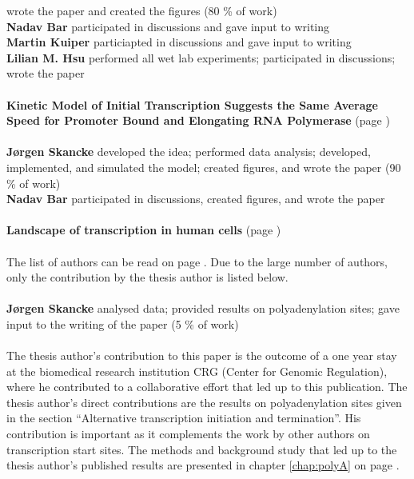 wrote the paper and created the figures (80 \% of work) \\
\textbf{Nadav Bar} participated in discussions and gave input to writing\\
\textbf{Martin Kuiper} particiapted in discussions and gave input to writing\\
\textbf{Lilian M. Hsu} performed all wet lab experiments;
participated in discussions; wrote the paper\\
\\
\textbf{Kinetic Model of Initial Transcription Suggests the Same Average Speed
for Promoter Bound and Elongating RNA Polymerase} (page \pageref{chap:kinetic_paper})\\
\\
\textbf{J\o rgen Skancke} developed the idea;
performed data analysis; developed, implemented, and simulated the model;
created figures, and wrote the paper (90 \% of work) \\
\textbf{Nadav Bar} participated in discussions, created figures, and wrote the
paper\\
\\
\textbf{Landscape of transcription in human cells} (page \pageref{landscape_attached})\\
\\
The list of authors can be read on page \pageref{landscape_attached}. Due to the large
number of authors, only the contribution by the thesis author is listed below.
\\
\\
\textbf{J\o rgen Skancke} analysed data; provided results on polyadenylation
sites; gave input to the writing of the paper (5 \% of work)\\
\\
The thesis author's contribution to this paper is the outcome of a one year
stay at the biomedical research institution CRG (Center for Genomic
Regulation), where he contributed to a collaborative effort that led up to this
publication. The thesis author's direct contributions are the results on
polyadenylation sites given in the section ``Alternative transcription
initiation and termination''. His contribution is important as it complements
the work by other authors on transcription start sites. The methods and
background study that led up to the thesis author's published results are
presented in chapter \ref{chap:polyA} on page \pageref{chap:polyA}.
